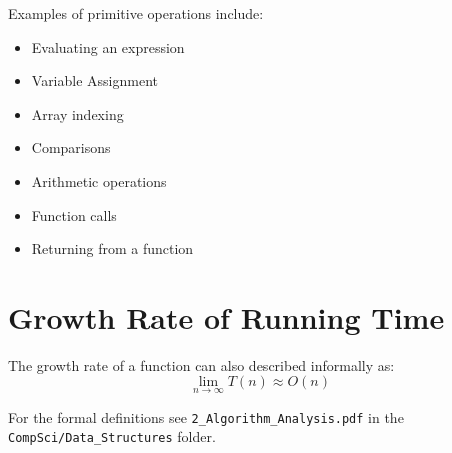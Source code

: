 \documentclass[12pt letter]{report}
\begin{document}
\noindent Examples of primitive operations include:
\begin{itemize}
  \item Evaluating an expression
  \item Variable Assignment
  \item Array indexing
  \item Comparisons
  \item Arithmetic operations
  \item Function calls
  \item Returning from a function
\end{itemize}

\section{Growth Rate of Running Time}

The growth rate of a function can also described informally as:
\[
  \lim_{n \to \infty} T \left( n \right) \approx O \left( n \right)
\]

\noindent For the formal definitions see \lstinline{2_Algorithm_Analysis.pdf} in the \lstinline{CompSci/Data_Structures} folder.

\end{document}
